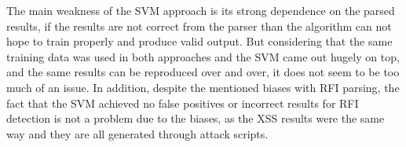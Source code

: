 The main weakness of the SVM approach is its strong dependence on the parsed results, if the results are not correct from the parser than the algorithm can not hope to train properly and produce valid output.  But considering that the same training data was used in both approaches and the SVM came out hugely on top, and the same results can be reproduced over and over, it does not seem to be too much of an issue.  In addition, despite the mentioned biases with RFI parsing, the fact that the SVM achieved no false positives or incorrect results for RFI detection is not a problem due to the biases, as the XSS results were the same way and they are all generated through attack scripts.

